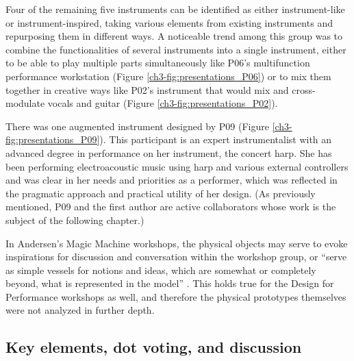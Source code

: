 \documentclass[letterpaper, 12pt]{article}
\begin{document}
Four of the remaining five instruments can be identified as either instrument-like or instrument-inspired, taking various elements from existing instruments and repurposing them in different ways. A noticeable trend among this group was to combine the functionalities of several instruments into a single instrument, either to be able to play multiple parts simultaneously like P06's multifunction performance workstation (Figure \ref{ch3-fig:presentations_P06}) or to mix them together in creative ways like P02's instrument that would mix and cross-modulate vocals and guitar (Figure \ref{ch3-fig:presentations_P02}). 

There was one augmented instrument designed by P09 (Figure \ref{ch3-fig:presentations_P09}). This participant is an expert instrumentalist with an advanced degree in performance on her instrument, the concert harp. She has been performing electroacoustic music using harp and various external controllers and was clear in her needs and priorities as a performer, which was reflected in the pragmatic approach and practical utility of her design. (As previously mentioned, P09 and the first author are active collaborators whose work is the subject of the following chapter.)


In Andersen's Magic Machine workshops, the physical objects may serve to evoke inspirations for discussion and conversation within the workshop group, or ``serve as simple vessels for notions and ideas, which are somewhat or completely beyond, what is represented in the model'' \citep[p. 63]{Andersen2017}. This holds true for the Design for Performance workshops as well, and therefore the physical prototypes themselves were not analyzed in further depth. 

\subsection{Key elements, dot voting, and discussion}
\label{ch3-sec:key-element-identification-and-dot-voting}

\end{document}
